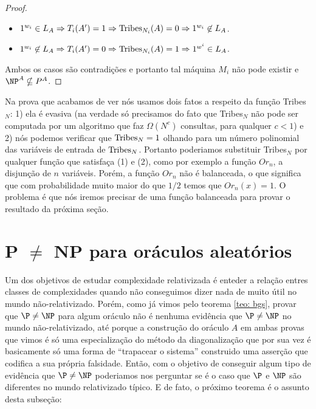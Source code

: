 \begin{proof}
\begin{itemize}

    \item $1^{w_{i}} \in L_{A} \Rightarrow T_{i}(A^{\prime}) = 1 \Rightarrow \text{Tribes}_{N_{i}}(A) = 0 \Rightarrow 1^{w_{i}} \not\in L_{A}$.

    \item $1^{w_{i}} \not\in L_{A} \Rightarrow T_{i}(A^{\prime}) = 0 \Rightarrow \text{Tribes}_{N_{i}}(A) = 1 \Rightarrow 1^{w^{i}} \in L_{A}$.

\end{itemize}

    Ambos os casos são contradições e portanto tal máquina $M_{i}$ não pode existir e $\NP^{A} \nsubseteq P^{A}$.

\end{proof}

Na prova que acabamos de ver nós usamos dois fatos a respeito da função Tribes$_{N}$: 1) ela é evasiva (na verdade só precisamos do fato que Tribes$_{N}$ não pode ser computada por um algoritmo que faz $\Omega(N^{c})$ consultas, para qualquer $c < 1$) e 2) nós podemos verificar que $\text{Tribes}_{N} = 1$ olhando para um número polinomial das variáveis de entrada de $\text{Tribes}_{N}$. Portanto poderiamos substituir Tribes$_{N}$ por qualquer função que satisfaça (1) e (2), como por exemplo a função $Or_{n}$, a disjunção de $n$ variáveis. Porém, a função $Or_{n}$ não é balanceada, o que significa que com probabilidade muito maior do que $1/2$ temos que $Or_{n}(x) = 1$. O problema é que nós iremos precisar de uma função balanceada para provar o resultado da próxima seção.

\section{P $\neq$ NP para oráculos aleatórios} \label{section_p_neq_np_random_oracles}

Um dos objetivos de estudar complexidade relativizada é enteder a relação entres classes de complexidades quando não conseguimos dizer nada de muito útil no mundo não-relativizado. Porém, como já vimos pelo teorema \ref{teo: bgs}, provar que $\P \neq \NP$ para algum oráculo não é nenhuma evidência que $\P \neq \NP$ no mundo não-relativizado, até porque a construção do oráculo $A$ em ambas provas que vimos é só uma especialização do método da diagonalização que por sua vez é basicamente só uma forma de ``trapacear o sistema'' construido uma asserção que codifica a sua própria falsidade. Então, com o objetivo de conseguir algum tipo de evidência que $\P \neq \NP$ poderiamos nos perguntar se é o caso que $\P$ e $\NP$ são diferentes no mundo relativizado típico. E de fato, o próximo teorema é o assunto desta subseção:

